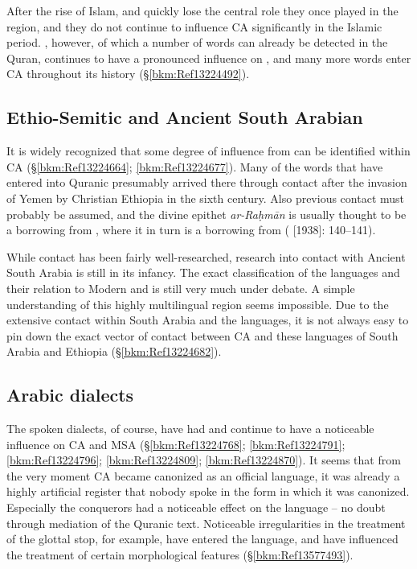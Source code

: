\documentclass[output=paper]{langsci/langscibook}
\begin{document}
After the rise of Islam,  and  quickly lose the central role they once played in the region, and they do not continue to influence CA significantly in the Islamic period. , however, of which a number of words can already be detected in the {Quran}, continues to have a pronounced influence on , and many more  words enter CA throughout its history (§\ref{bkm:Ref13224492}).

\subsection{Ethio-Semitic and Ancient South Arabian}

It is widely recognized that some degree of influence from  can be identified within CA (§\ref{bkm:Ref13224664}; \ref{bkm:Ref13224677}). Many of the  words that have entered into Quranic  presumably arrived there through  contact after the invasion of {Yemen} by Christian Ethiopia in the sixth century. Also previous  contact must probably be assumed, and the divine epithet \textit{ar-Raḥmān} is usually thought to be a borrowing from , where it in turn is a borrowing from  (\citealt{Jeffrey2007} [1938]: 140--141). 

While  contact has been fairly well-researched, research into contact with Ancient South Arabia is still in its infancy. The exact classification of the  languages and their relation to Modern  and  is still very much under debate. A simple understanding of this highly multilingual region seems impossible. Due to the extensive contact within South Arabia and the  languages, it is not always easy to pin down the exact vector of contact between CA and these languages of South Arabia and Ethiopia (§\ref{bkm:Ref13224682}).

\subsection{\label{bkm:Ref13224768}Arabic dialects}

The spoken  dialects, of course, have had and continue to have a noticeable influence on CA and MSA (§\ref{bkm:Ref13224768}; \ref{bkm:Ref13224791}; \ref{bkm:Ref13224796}; \ref{bkm:Ref13224809}; \ref{bkm:Ref13224870}). It seems that from the very moment CA became canonized as an official language, it was already a highly artificial {register} that nobody spoke in the form in which it was canonized. Especially the  conquerors had a noticeable effect on the language – no doubt through mediation of the Quranic text. Noticeable irregularities in the treatment of the glottal stop, for example, have entered the language, and have influenced the treatment of certain morphological features (§\ref{bkm:Ref13577493}).
\end{document}
